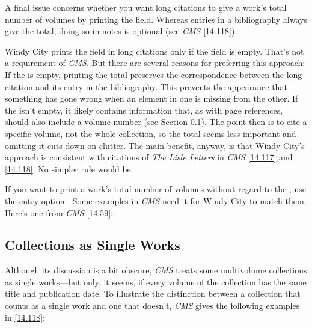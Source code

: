 \documentclass[11pt,letterpaper,oneside]{article}
\begin{document}
A final issue concerns whether you want long citations to give a
work's total number of volumes by printing the 
field. Whereas entries in a bibliography always give the total, doing
so in notes is optional (see \textit{CMS} \ref{14.118}).

Windy City prints the  field in long citations only
if the  field is empty. That's not a requirement of
\textit{CMS}. But there are several reasons for preferring this
approach: If the  is empty, printing the total
preserves the correspondence between the long citation and its entry
in the bibliography. This prevents the appearance that something has
gone wrong when an element in one is missing from the other. If the
 isn't empty, it likely contains information that,
as with page references, should also include a volume number (see
Section \ref{multivolume}). The point then is to cite a specific
volume, not the whole collection, so the total seems less important
and omitting it cuts down on clutter. The main benefit, anyway, is
that Windy City's approach is consistent with citations of \textit{The
Lisle Letters} in \textit{CMS} \ref{14.117} and \ref{14.118}. No
simpler rule would be.

If you want to print a work's total number of volumes without regard
to the , use the entry option . Some
examples in \textit{CMS} need it for Windy City to match them. Here's
one from \textit{CMS} \ref{14.59}:

\begin{citeonly}
\item \cite[1:126]{shurtleff1853}
\end{citeonly}

\subsection{Collections as Single Works}
\label{multivolume}

Although its discussion is a bit obscure, \textit{CMS} treats some
multivolume collections as single works---but only, it seems, if every
volume of the collection has the same title and publication date. To
illustrate the distinction between a collection that counts as a
single work and one that doesn't, \textit{CMS} gives the following
examples in \ref{14.118}:

\begin{citeonly}
\item \cite[4:243]{byrne1981}
\item \cite*[32--33]{james1963.5}
\item \cite[4:245]{byrne1981}
\item \cite*[34]{james1963.5}
\end{citeonly}
\end{document}

